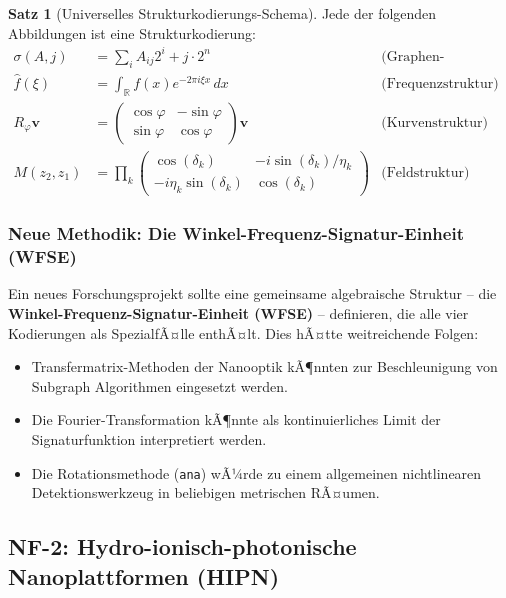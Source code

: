 ﻿\documentclass[a4paper,12pt]{scrreprt}
\theoremstyle{definition}
\newtheorem{satz}{Satz}[section]
\begin{document}
\begin{satz}[Universelles Strukturkodierungs-Schema]
  Jede der folgenden Abbildungen ist eine Strukturkodierung:
  \begin{align*}
    \sigma(A, j) &= \sum_i A_{ij} 2^i + j \cdot 2^n
      & \text{(Graphen-Fingerabdruck)} \\
    \hat{f}(\xi)  &= \int_{\mathbb{R}} f(x) e^{-2\pi i \xi x}\, dx
      & \text{(Frequenzstruktur)} \\
    R_\varphi \mathbf{v} &= \begin{pmatrix}\cos\varphi & -\sin\varphi \\ \sin\varphi & \cos\varphi\end{pmatrix} \mathbf{v}
      & \text{(Kurvenstruktur)} \\
    M(z_2, z_1) &= \prod_k \begin{pmatrix} \cos(\delta_k) & -i\sin(\delta_k)/\eta_k \\ -i\eta_k\sin(\delta_k) & \cos(\delta_k)\end{pmatrix}
      & \text{(Feldstruktur)}
  \end{align*}
\end{satz}

\subsubsection{Neue Methodik: Die Winkel-Frequenz-Signatur-Einheit (WFSE)}

Ein neues Forschungsprojekt sollte eine gemeinsame algebraische Struktur --
die \textbf{Winkel-Frequenz-Signatur-Einheit (WFSE)} -- definieren, die alle
vier Kodierungen als SpezialfÃ¤lle enthÃ¤lt. Dies hÃ¤tte weitreichende Folgen:

\begin{itemize}
  \item Transfermatrix-Methoden der Nanooptik kÃ¶nnten zur
    Beschleunigung von Subgraph Algorithmen eingesetzt werden.
  \item Die Fourier-Transformation kÃ¶nnte als kontinuierliches
    Limit der Signaturfunktion interpretiert werden.
  \item Die Rotationsmethode (\texttt{ana}) wÃ¼rde zu einem
    allgemeinen nichtlinearen Detektionswerkzeug in beliebigen
    metrischen RÃ¤umen.
\end{itemize}

\subsection{NF-2: Hydro-ionisch-photonische Nanoplattformen (HIPN)}
\end{document}

